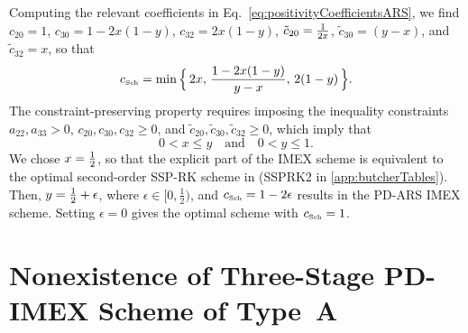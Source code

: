 Computing the relevant coefficients in Eq.~\eqref{eq:positivityCoefficientsARS}, we find $c_{20}=1$, $c_{30}=1-2x(1-y)$, $c_{32}=2x(1-y)$, $\tilde{c}_{20}=\frac{1}{2x}$, $\tilde{c}_{30}=(y-x)$, and $\tilde{c}_{32}=x$, so that
\begin{equation}
  c_{\mbox{\tiny Sch}} = \min \Big\{\, 2x,\, \frac{1-2x(1-y)}{y-x},\, 2(1-y) \,\Big\}.  
\end{equation}
The constraint-preserving property requires imposing the inequality constraints $a_{22},a_{33}>0$, $c_{20},c_{30},c_{32}\ge0$, and $\tilde{c}_{20},\tilde{c}_{30},\tilde{c}_{32}\ge0$, which imply that
\begin{equation}
  0 < x \le y
  \quad\text{and}\quad
  0 < y \le 1.
\end{equation}
We chose $x=\frac{1}{2}$, so that the explicit part of the IMEX scheme is equivalent to the optimal second-order SSP-RK scheme in \cite{gottlieb_etal_2001} (SSPRK2 in \ref{app:butcherTables}).  
Then, $y=\frac{1}{2} + \epsilon$, where $\epsilon \in [0, \frac{1}{2})$, and $c_{\mbox{\tiny Sch}} = 1 - 2\epsilon$ results in the PD-ARS IMEX scheme.  
Setting $\epsilon = 0$ gives the optimal scheme with $c_{\mbox{\tiny Sch}} = 1$.  

\section{Nonexistence of Three-Stage PD-IMEX Scheme of Type~A}
\label{app:noTypeA}

